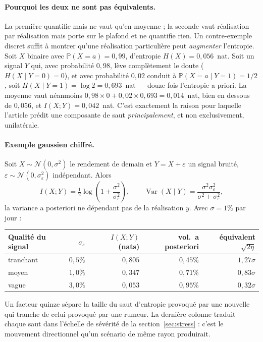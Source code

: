 \paragraph{Pourquoi les deux ne sont pas équivalents.} La première quantifie
mais ne vaut qu'en moyenne ; la seconde vaut réalisation par réalisation mais
porte sur le plafond et ne quantifie rien. Un contre-exemple discret suffit à
montrer qu'une réalisation particulière peut \emph{augmenter} l'entropie. Soit
$X$ binaire avec $\mathbb{P}(X=a)=0{,}99$, d'entropie $H(X)=0{,}056$~nat. Soit
un signal $Y$ qui, avec probabilité $0{,}98$, lève complètement le doute
($H(X\mid Y=0)=0$), et avec probabilité $0{,}02$ conduit à
$\mathbb{P}(X=a\mid Y=1)=1/2$, soit $H(X\mid Y=1)=\log 2=0{,}693$~nat --- douze
fois l'entropie a priori. La moyenne vaut néanmoins
$0{,}98\times0+0{,}02\times0{,}693=0{,}014$~nat, bien en dessous de $0{,}056$,
et $I(X;Y)=0{,}042$~nat. C'est exactement la raison pour laquelle l'article
prédit une composante de saut \emph{principalement}, et non exclusivement,
unilatérale.

\paragraph{Exemple gaussien chiffré.} Soit $X\sim\mathcal N(0,\sigma^2)$ le
rendement de demain et $Y=X+\varepsilon$ un signal bruité,
$\varepsilon\sim\mathcal N(0,\sigma_\varepsilon^2)$ indépendant. Alors
\begin{equation}
\label{eq:mi-gauss}
I(X;Y)=\tfrac12\log\!\left(1+\frac{\sigma^2}{\sigma_\varepsilon^2}\right),
\qquad
\operatorname{Var}(X\mid Y)=\frac{\sigma^2\sigma_\varepsilon^2}{\sigma^2+\sigma_\varepsilon^2},
\end{equation}
la variance a posteriori ne dépendant pas de la réalisation $y$. Avec
$\sigma=1\%$ par jour :

\begin{center}
\small
\begin{tabular}{@{}lrrrr@{}}
\toprule
Qualité du signal & $\sigma_\varepsilon$ & $I(X;Y)$ (nats) & vol.\ a posteriori & équivalent $\sqrt{2\eta}$ \\
\midrule
tranchant   & $0{,}5\%$ & $0{,}805$ & $0{,}45\%$ & $1{,}27\sigma$ \\
moyen       & $1{,}0\%$ & $0{,}347$ & $0{,}71\%$ & $0{,}83\sigma$ \\
vague       & $3{,}0\%$ & $0{,}053$ & $0{,}95\%$ & $0{,}32\sigma$ \\
\bottomrule
\end{tabular}
\end{center}

Un facteur quinze sépare la taille du saut d'entropie provoqué par une nouvelle
qui tranche de celui provoqué par une rumeur. La dernière colonne traduit chaque
saut dans l'échelle de sévérité de la section~\ref{sec:stress} : c'est le
mouvement directionnel qu'un scénario de même rayon produirait.

